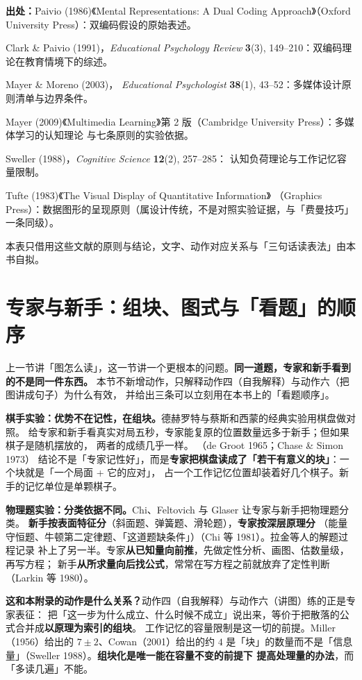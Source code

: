 {\footnotesize
\textbf{出处：}Paivio (1986)《Mental Representations: A Dual Coding Approach》（Oxford
University Press）：双编码假设的原始表述。

Clark \& Paivio (1991)，\textit{Educational Psychology
Review} \textbf{3}(3), 149--210：双编码理论在教育情境下的综述。

Mayer \& Moreno (2003)，
\textit{Educational Psychologist} \textbf{38}(1), 43--52：多媒体设计原则清单与边界条件。

Mayer (2009)《Multimedia Learning》第 2 版（Cambridge University Press）：多媒体学习的认知理论
与七条原则的实验依据。

Sweller (1988)，\textit{Cognitive Science} \textbf{12}(2), 257--285：
认知负荷理论与工作记忆容量限制。

Tufte (1983)《The Visual Display of Quantitative Information》
（Graphics Press）：数据图形的呈现原则（属设计传统，不是对照实验证据，与「费曼技巧」一条同级）。

本表只借用这些文献的原则与结论，文字、动作对应关系与「三句话读表法」由本书自拟。
}

\section{专家与新手：组块、图式与「看题」的顺序}
\label{sec:app-i-expert}

上一节讲「图怎么读」，这一节讲一个更根本的问题。\textbf{同一道题，专家和新手看到的不是同一件东西。}
本节不新增动作，只解释动作四（自我解释）与动作六（把图讲成句子）为什么有效，
并给出三条可以立刻用在本书上的「看题顺序」。

\textbf{棋手实验：优势不在记性，在组块。}德赫罗特与蔡斯和西蒙的经典实验用棋盘做对照。
给专家和新手看真实对局五秒，专家能复原的位置数量远多于新手；但如果棋子是随机摆放的，
两者的成绩几乎一样。
（de Groot 1965；Chase \& Simon 1973）
结论不是「专家记性好」，而是\textbf{专家把棋盘读成了「若干有意义的块」}：一个块就是「一个局面 + 它的应对」，
占一个工作记忆位置却装着好几个棋子。新手的记忆单位是单颗棋子。

\textbf{物理题实验：分类依据不同。}Chi、Feltovich 与 Glaser 让专家与新手把物理题分类。
\textbf{新手按表面特征分}（斜面题、弹簧题、滑轮题），\textbf{专家按深层原理分}
（能量守恒题、牛顿第二定律题、「这道题缺条件」）（Chi 等 1981）。拉金等人的解题过程记录
补上了另一半。专家\textbf{从已知量向前推}，先做定性分析、画图、估数量级，再写方程；
新手\textbf{从所求量向后找公式}，常常在写方程之前就放弃了定性判断（Larkin 等 1980）。

\textbf{这和本附录的动作是什么关系？}动作四（自我解释）与动作六（讲图）练的正是专家表征：
把「这一步为什么成立、什么时候不成立」说出来，等价于把散落的公式合并成\textbf{以原理为索引的组块}。
工作记忆的容量限制是这一切的前提。Miller（1956）给出的 $7\pm2$、Cowan（2001）给出的约 $4$
是「块」的数量而不是「信息量」（Sweller 1988）。\textbf{组块化是唯一能在容量不变的前提下
提高处理量的办法}，而「多读几遍」不能。

